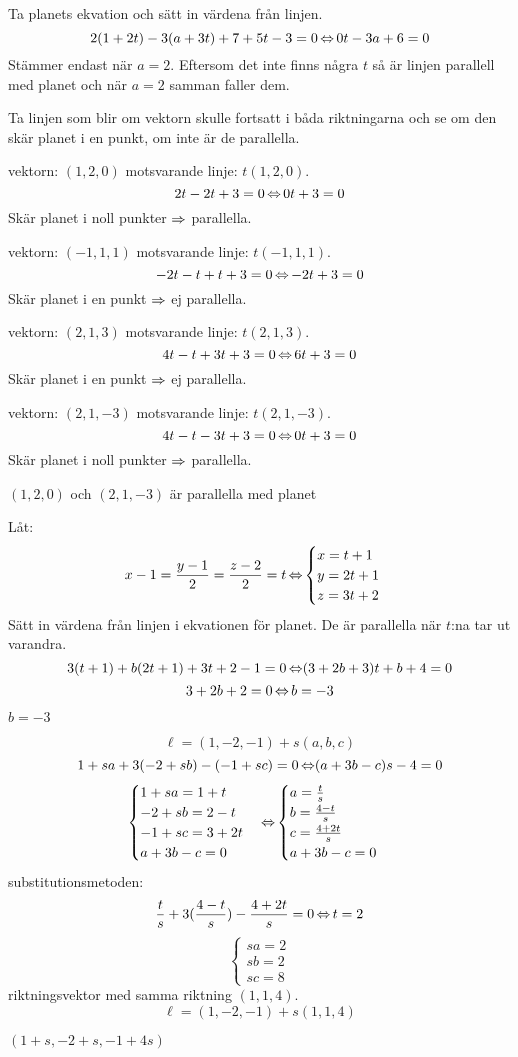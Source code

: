 \begin{task}{3.20}
	Ta planets ekvation och sätt in värdena från linjen.
	\[2(1+2t)-3(a+3t)+7+5t-3=0 \operatorname{\Leftrightarrow}
	0t-3a+6=0\]
	Stämmer endast när $a=2$. 
	Eftersom det inte finns några $t$ så är linjen parallell med planet och när $a=2$ samman faller dem.
\end{task}

\begin{task}{3.21}
	Ta linjen som blir om vektorn skulle fortsatt i båda riktningarna och se om den skär planet i en punkt, om inte är de parallella.

	vektorn: $(1,2,0)$ motsvarande linje: $t(1,2,0)$.
	\[2t-2t+3=0 \operatorname{\Leftrightarrow}
	0t+3=0\]
	Skär planet i noll punkter $\operatorname{\Rightarrow}$ parallella.

	vektorn: $(-1,1,1)$ motsvarande linje: $t(-1,1,1)$.
	\[-2t-t+t+3=0 \operatorname{\Leftrightarrow}
	-2t+3=0\]
	Skär planet i en punkt $\operatorname{\Rightarrow}$ ej parallella.

	vektorn: $(2,1,3)$ motsvarande linje: $t(2,1,3)$.
	\[4t-t+3t+3=0 \operatorname{\Leftrightarrow}
	6t+3=0\]
	Skär planet i en punkt $\operatorname{\Rightarrow}$ ej parallella.

	vektorn: $(2,1,-3)$ motsvarande linje: $t(2,1,-3)$.
	\[4t-t-3t+3=0 \operatorname{\Leftrightarrow}
	0t+3=0\]
	Skär planet i noll punkter $\operatorname{\Rightarrow}$ parallella.

	\ans $(1,2,0)$ och $(2,1,-3)$ är parallella med planet
\end{task}

\begin{task}{3.22}
	Låt:
	\[x-1=\frac{y-1}{2}=\frac{z-2}{2}=t \operatorname{\Leftrightarrow}
	\begin{cases}
		x=t+1 \\
		y=2t+1 \\
		z=3t+2
	\end{cases}\]
	Sätt in värdena från linjen i ekvationen för planet. De är parallella när $t$:na tar ut varandra.
	\[3(t+1)+b(2t+1)+3t+2-1=0 \operatorname{\Leftrightarrow}
	(3+2b+3)t+b+4=0\]
	\[3+2b+2=0 \operatorname{\Leftrightarrow}
	b=-3\]

	\ans $b=-3$
\end{task}

\begin{task}{3.23}
	\[\ell=(1,-2,-1)+s(a,b,c)\]
	\[1+sa+3(-2+sb)-(-1+sc)=0 \operatorname{\Leftrightarrow}
	(a+3b-c)s-4=0\]
	\[\begin{cases}
		1+sa=1+t \\
		-2+sb=2-t \\
		-1+sc=3+2t \\
		a+3b-c=0
	\end{cases} \operatorname{\Leftrightarrow}
	\begin{cases}
		a=\frac{t}{s} \\
		b=\frac{4-t}{s} \\ 
		c=\frac{4+2t}{s} \\
		a+3b-c=0
	\end{cases}\]
	substitutionsmetoden:
	\[\frac{t}{s}+3(\frac{4-t}{s})-\frac{4+2t}{s}=0 \operatorname{\Leftrightarrow} t=2\]
	\[\begin{cases}
		sa=2 \\
		sb=2 \\
		sc=8
	\end{cases}\]
	riktningsvektor med samma riktning $(1,1,4)$.
	\[\ell=(1,-2,-1)+s(1,1,4)\]

	\ans $(1+s,-2+s,-1+4s)$
\end{task}

